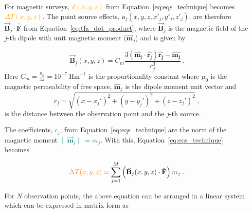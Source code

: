 For magnetic surveys, \textcolor{orange}{$d (x, y, z)$} from Equation~\ref{eq:eqs_technique} becomes \textcolor{orange}{$\Delta T(x, y, z)$}. The point source effects, $a_j(x, y, z, x'_j, y'_j , z'_j)$, are therefore $\vec{\mathbf{B}}_j \cdot \hat{\mathbf{F}}$ from Equation~\ref{eq:tfa_dot_product}, where $\vec{\mathbf{B}}_j$ is the magnetic field of the $j$-th dipole with unit magnetic moment ($\vec{\mathbf{m}}_j$) and is given by \citep{Blakley1995}

\begin{equation}
    \vec{\mathbf{B}}_j (x, y, z) = C_m \dfrac{3 \left( \hat{\mathbf{m_j}} \cdot \hat{\mathbf{r_j}} \right) \hat{\mathbf{r_j}} - \hat{\mathbf{m_j}}}{r_j^3}
    \ .
    \label{eq:magnetic_field}
\end{equation}
\noindent
Here $C_m = \frac{\mu_0}{4 \pi} = 10^{-7} \ \text{Hm}^{-1}$ is the proportionality constant where $\mu_0$ is the magnetic permeability of free space, $\hat{\mathbf{m}}_j$ is the dipole moment unit vector and
\begin{equation}
    r_j = \sqrt{(x - x_j')^2 + (y - y_j')^2 + (z - z_j')^2}
    \ ,
\end{equation}
is the distance between the observation point and the $j$-th source. 

The coefficients, \textcolor{teal}{$c_j$}, from Equation~\ref{eq:eqs_technique} are the norm of the magnetic moment \textcolor{teal}{$\lVert \vec{\mathbf{m}}_j \rVert = m_j$}. With this, Equation~\ref{eq:eqs_technique} becomes

\begin{equation}
\label{eq:tfa_eqs}
\textcolor{orange}{\Delta T (x, y, z)} = \sum_{j=1}^{M} \left(\vec{\mathbf{B}}_j(x, y, z) \cdot \hat{\mathbf{F}}\right) \textcolor{teal}{m_j}
\ .
\end{equation}

For $N$ observation points, the above equation can be arranged in a linear system which can be expressed in matrix form as

